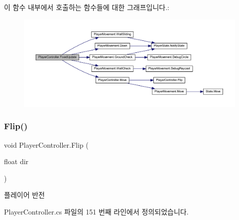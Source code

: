 이 함수 내부에서 호출하는 함수들에 대한 그래프입니다.\+:\nopagebreak
\begin{figure}[H]
\begin{center}
\leavevmode
\includegraphics[width=350pt]{dc/dde/class_player_controller_ae5bdb1b48571f67c3f722a58b6f404d4_cgraph}
\end{center}
\end{figure}
\mbox{\label{class_player_controller_a4cc61bc6a9187892458138a1d0ffc207}} 
\subsubsection{\texorpdfstring{Flip()}{Flip()}}
{\footnotesize\ttfamily void Player\+Controller.\+Flip (\begin{DoxyParamCaption}\item[{float}]{dir }\end{DoxyParamCaption})}



플레이어 반전 



Player\+Controller.\+cs 파일의 151 번째 라인에서 정의되었습니다.


